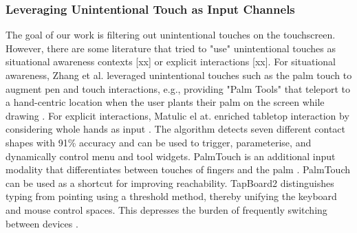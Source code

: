 

\subsubsection{Leveraging Unintentional Touch as Input Channels}

The goal of our work is filtering out unintentional touches on the touchscreen. However, there are some literature that tried to "use" unintentional touches as situational awareness contexts [xx] or explicit interactions [xx]. For situational awareness, Zhang et al. leveraged unintentional touches such as the palm touch to augment pen and touch interactions, e.g., providing "Palm Tools" that teleport to a hand-centric location when the user plants their palm on the screen while drawing \cite{2019-PenTouch}. For explicit interactions, Matulic el at. enriched tabletop interaction by considering whole hands as input \cite{2017-HandContact}. The algorithm detects seven different contact shapes with 91\% accuracy and can be used to trigger, parameterise, and dynamically control menu and tool widgets. PalmTouch is an additional input modality that differentiates between touches of fingers and the palm \cite{2018-PalmTouch}. PalmTouch can be used as a shortcut for improving reachability. TapBoard2 \cite{2016-TapBoard2} distinguishes typing from pointing using a threshold method, thereby unifying the keyboard and mouse control spaces. This depresses the burden of frequently switching between devices \cite{2006-TouchType}.

